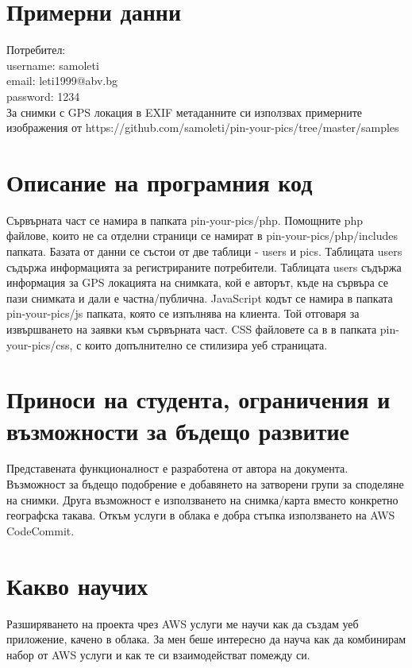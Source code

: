 \documentclass[12pt]{article}
\begin{document}
\section{Примерни данни}

Потребител: \\
username: samoleti \\
email: leti1999@abv.bg	\\
password: 1234 \\
За снимки с GPS локация в EXIF метаданните си използвах примерните изображения от https://github.com/samoleti/pin-your-pics/tree/master/samples

 
\section{Описание на програмния код}

Сървърната част се намира в папката pin-your-pics/php. Помощните php файлове, които не са отделни страници се намират в pin-your-pics/php/includes папката.
\newline
Базата от данни се състои от две таблици - users и pics. Таблицата users съдържа информацията за регистрираните потребители. Таблицата users съдържа информация за GPS локацията на снимката, кой е авторът, къде на сървъра се пази снимката и дали е частна/публична.
\newline
JavaScript кодът се намира в папката pin-your-pics/js папката, която се изпълнява на клиента. Той отговаря за извършването на заявки към сървърната част.
\newline
CSS файловете са в в папката pin-your-pics/css, с които допълнително се стилизира уеб страницата. 


\medskip


\section{Приноси на студента, ограничения и възможности за бъдещо развитие}

Представената функционалност е разработена от автора на документа. \\
Възможност за бъдещо подобрение е добавянето на затворени групи за споделяне на снимки. Друга възможност е използването на снимка/карта вместо конкретно географска такава. Откъм услуги в облака е добра стъпка използването на AWS CodeCommit.

\medskip

\section{Какво научих}
Разширяването на проекта чрез AWS услуги ме научи как да създам уеб приложение, качено в облака. За мен беше интересно да науча как да комбинирам набор от AWS услуги и как те си взаимодействат помежду си.
\end{document}
